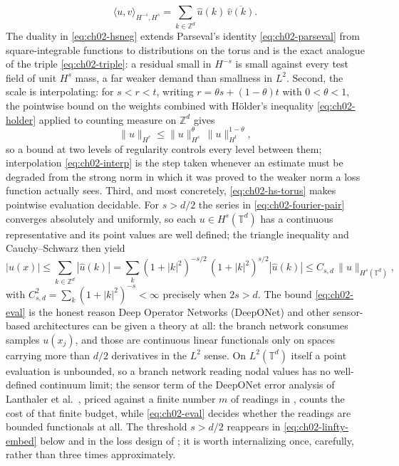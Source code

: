 \begin{equation}
  \langle u, v \rangle_{H^{-s}, H^s} = \sum_{k \in \mathbb{Z}^d} \hat{u}(k) \, \overline{\hat{v}(k)} .
  \label{eq:ch02-hsneg}
\end{equation}
The duality in \eqref{eq:ch02-hsneg} extends Parseval's identity \eqref{eq:ch02-parseval} from square-integrable functions to distributions on the torus and is the exact analogue of the triple \eqref{eq:ch02-triple}: a residual small in $H^{-s}$ is small against every test field of unit $H^s$ mass, a far weaker demand than smallness in $L^2$. Second, the scale is interpolating: for $s < r < t$, writing $r = \theta s + (1-\theta)t$ with $0 < \theta < 1$, the pointwise bound on the weights combined with H\"older's inequality \eqref{eq:ch02-holder} applied to counting measure on $\mathbb{Z}^d$ gives
\begin{equation}
  \|u\|_{H^r} \le \|u\|_{H^s}^{\theta} \, \|u\|_{H^t}^{1-\theta},
  \label{eq:ch02-interp}
\end{equation}
so a bound at two levels of regularity controls every level between them; interpolation \eqref{eq:ch02-interp} is the step taken whenever an estimate must be degraded from the strong norm in which it was proved to the weaker norm a loss function actually sees. Third, and most concretely, \eqref{eq:ch02-hs-torus} makes pointwise evaluation decidable. For $s > d/2$ the series in \eqref{eq:ch02-fourier-pair} converges absolutely and uniformly, so each $u \in H^s(\mathbb{T}^d)$ has a continuous representative and its point values are well defined; the triangle inequality and Cauchy--Schwarz then yield
\begin{equation}
  |u(x)| \le \sum_{k \in \mathbb{Z}^d} |\hat{u}(k)|
  = \sum_{k} (1+|k|^2)^{-s/2} \, (1+|k|^2)^{s/2} |\hat{u}(k)|
  \le C_{s,d} \, \|u\|_{H^s(\mathbb{T}^d)},
  \label{eq:ch02-eval}
\end{equation}
with $C_{s,d}^2 = \sum_k (1+|k|^2)^{-s} < \infty$ precisely when $2s > d$. The bound \eqref{eq:ch02-eval} is the honest reason Deep Operator Networks (DeepONet) and other sensor-based architectures can be given a theory at all: the branch network consumes samples $u(x_j)$, and those are continuous linear functionals only on spaces carrying more than $d/2$ derivatives in the $L^2$ sense. On $L^2(\mathbb{T}^d)$ itself a point evaluation is unbounded, so a branch network reading nodal values has no well-defined continuum limit; the sensor term of the DeepONet error analysis of Lanthaler et al.~\cite{lanthaler2022error}, priced against a finite number $m$ of readings in , counts the cost of that finite budget, while \eqref{eq:ch02-eval} decides whether the readings are bounded functionals at all. The threshold $s > d/2$ reappears in \eqref{eq:ch02-linfty-embed} below and in the loss design of ; it is worth internalizing once, carefully, rather than three times approximately.

